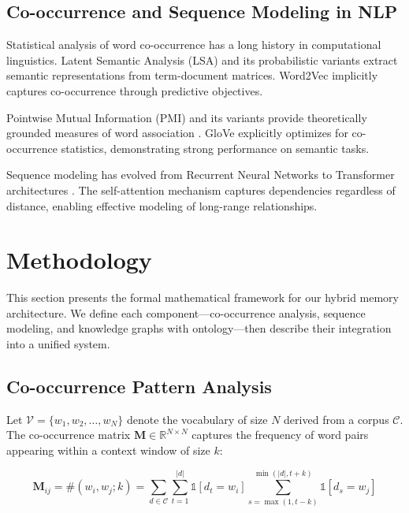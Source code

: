 \documentclass[conference]{IEEEtran}
\begin{document}
\subsection{Co-occurrence and Sequence Modeling in NLP}

Statistical analysis of word co-occurrence has a long history in computational linguistics. Latent Semantic Analysis (LSA) \cite{deerwester1990indexing} and its probabilistic variants extract semantic representations from term-document matrices. Word2Vec \cite{mikolov2013efficient} implicitly captures co-occurrence through predictive objectives.

Pointwise Mutual Information (PMI) and its variants provide theoretically grounded measures of word association \cite{church1990word}. GloVe \cite{pennington2014glove} explicitly optimizes for co-occurrence statistics, demonstrating strong performance on semantic tasks.

Sequence modeling has evolved from Recurrent Neural Networks \cite{hochreiter1997long} to Transformer architectures \cite{vaswani2017attention}. The self-attention mechanism captures dependencies regardless of distance, enabling effective modeling of long-range relationships.

\section{Methodology}

This section presents the formal mathematical framework for our hybrid memory architecture. We define each component—co-occurrence analysis, sequence modeling, and knowledge graphs with ontology—then describe their integration into a unified system.

\subsection{Co-occurrence Pattern Analysis}

Let $\mathcal{V} = \{w_1, w_2, \ldots, w_N\}$ denote the vocabulary of size $N$ derived from a corpus $\mathcal{C}$. The co-occurrence matrix $\mathbf{M} \in \mathbb{R}^{N \times N}$ captures the frequency of word pairs appearing within a context window of size $k$:

\begin{equation}
\mathbf{M}_{ij} = \#(w_i, w_j; k) = \sum_{d \in \mathcal{C}} \sum_{t=1}^{|d|} \mathbb{1}[d_t = w_i] \sum_{s=\max(1,t-k)}^{\min(|d|,t+k)} \mathbb{1}[d_s = w_j]
\end{equation}
\end{document}
